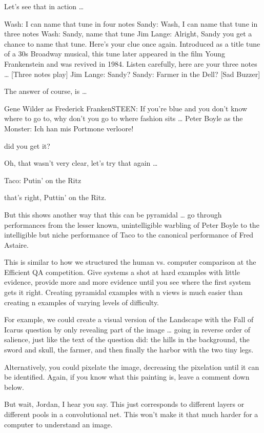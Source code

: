 Let’s see that in action … 

Wash: I can name that tune in four notes
Sandy: Wash, I can name that tune in three notes
Wash: Sandy, name that tune
Jim Lange: Alright, Sandy you get a chance to name that tune.  Here’s your clue once again.  Introduced as a title tune of a 30s Broadway musical, this tune later appeared in the film Young Frankenstein and was revived in 1984.  Listen carefully, here are your three notes …
[Three notes play]
Jim Lange: Sandy?
Sandy: Farmer in the Dell?
[Sad Buzzer]

The answer of course, is … 

Gene Wilder as Frederick FrankenSTEEN: If you’re blue and you don’t know where to go to, why don’t you go to where fashion sits …
Peter Boyle as the Monster: Ich han mis Portmone verloore!


did you get it?

Oh, that wasn’t very clear, let’s try that again … 

Taco: Putin’ on the Ritz

that’s right, Puttin’ on the Ritz.

But this shows another way that this can be pyramidal … go through performances from the lesser known, unintelligible warbling of Peter Boyle to the intelligible but niche performance of Taco to the canonical performance of Fred Astaire.  

This is similar to how we structured the human vs. computer comparison at the Efficient QA competition.  Give systems a shot at hard examples with little evidence, provide more and more evidence until you see where the first system gets it right.  Creating pyramidal examples with n views is much easier than creating n examples of varying levels of difficulty.

For example, we could create a visual version of the Landscape with the Fall of Icarus question by only revealing part of the image … going in reverse order of salience, just like the text of the question did: the hills in the background, the sword and skull, the farmer, and then finally the harbor with the two tiny legs.  

Alternatively, you could pixelate the image, decreasing the pixelation until it can be identified.  Again, if you know what this painting is, leave a comment down below.

But wait, Jordan, I hear you say.  This just  corresponds to different layers or different pools in a convolutional net.  This won’t make it that much harder for a computer to understand an image.  

